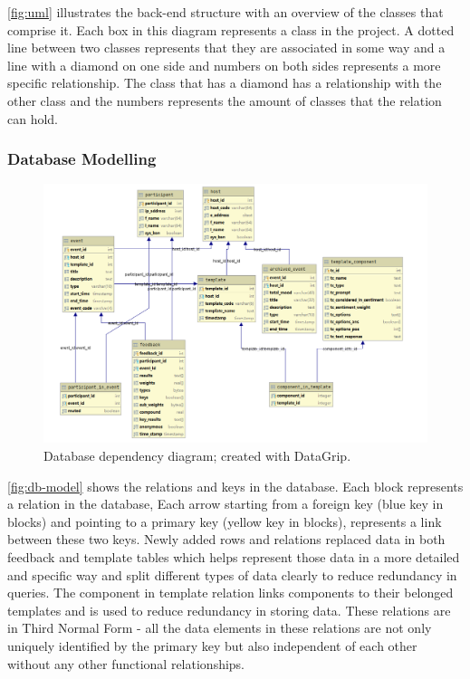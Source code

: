 \documentclass[9pt, titlepage]{extarticle}
\begin{document}
\autoref{fig:uml} illustrates the back-end structure with an overview of the classes that comprise it. Each box in this diagram represents a class in the project. A dotted line between two classes represents that they are associated in some way and a line with a diamond on one side and numbers on both sides represents a more specific relationship. The class that has a diamond has a relationship with the other class and the numbers represents the amount of classes that the relation can hold.

\subsubsection{Database Modelling}

\begin{figure}[H]
    \centering
    \includegraphics[width=5in]{images/db-model.png}
    \caption{Database dependency diagram; created with DataGrip.}
    \label{fig:db-model}
\end{figure}

\autoref{fig:db-model} shows the relations and keys in the database. Each block represents a relation in the database, Each arrow starting from a foreign key (blue key in blocks) and pointing to a primary key (yellow key in blocks), represents a link between these two keys. Newly added rows and relations replaced data in both feedback and template tables which helps represent those data in a more detailed and specific way and split different types of data clearly to reduce redundancy in queries. The component in template relation links components to their belonged templates and is used to reduce redundancy in storing data. These relations are in Third Normal Form - all the data elements in these relations are not only uniquely identified by the primary key but also independent of each other without any other functional relationships.
\end{document}
